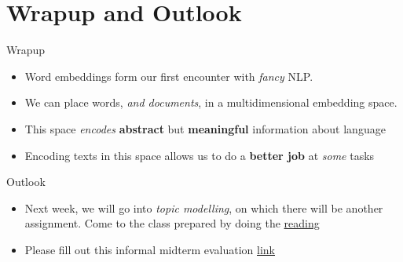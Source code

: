\documentclass[
  10pt,
  ignorenonframetext,
  aspectratio=169]{beamer}
\newif\ifbibliography
\begin{document}
\hypertarget{wrapup-and-outlook}{%
\section{Wrapup and Outlook}\label{wrapup-and-outlook}}

\begin{frame}{Wrapup}
\protect\hypertarget{wrapup}{}
\begin{itemize}
  \item<1->Word embeddings form our first encounter with \textit{fancy} NLP.
  \item<2->We can place words, \textit{and documents}, in a multidimensional embedding space.
  \item<3->This space \textit{encodes} \textbf{abstract} but \textbf{meaningful} information about language
  \item<4->Encoding texts in this space allows us to do a \textbf{better job} at \textit{some} tasks
\end{itemize}
\end{frame}

\begin{frame}{Outlook}
\protect\hypertarget{outlook}{}
\begin{itemize}
  \item<1->Next week, we will go into \textit{topic modelling}, on which there will be another assignment. Come to the class prepared by doing the  \href{http://www.cs.columbia.edu/~blei/papers/Blei2012.pdf}{reading}
  \item<2->Please fill out this informal midterm evaluation \href{https://forms.gle/MZLSxZHRnYCCMZmm6}{link}
\end{itemize}
\end{frame}

\begin{frame}[allowframebreaks]{}
  \bibliographytrue
  
\end{frame}
\end{document}
